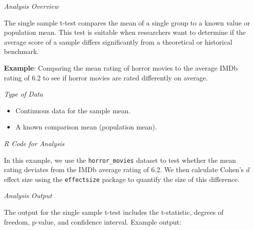 \documentclass[
]{book}
\newenvironment{Shaded}{\begin{snugshade}}{\end{snugshade}}
\newcommand{\AttributeTok}[1]{\textcolor[rgb]{0.13,0.29,0.53}{#1}}
\newcommand{\CommentTok}[1]{\textcolor[rgb]{0.56,0.35,0.01}{\textit{#1}}}
\newcommand{\FloatTok}[1]{\textcolor[rgb]{0.00,0.00,0.81}{#1}}
\newcommand{\FunctionTok}[1]{\textcolor[rgb]{0.13,0.29,0.53}{\textbf{#1}}}
\newcommand{\NormalTok}[1]{#1}
\newcommand{\OtherTok}[1]{\textcolor[rgb]{0.56,0.35,0.01}{#1}}
\newcommand{\SpecialCharTok}[1]{\textcolor[rgb]{0.81,0.36,0.00}{\textbf{#1}}}
\providecommand{\tightlist}{%
  \setlength{\itemsep}{0pt}\setlength{\parskip}{0pt}}
\begin{document}
\emph{Analysis Overview}

The single sample t-test compares the mean of a single group to a known value or population mean. This test is suitable when researchers want to determine if the average score of a sample differs significantly from a theoretical or historical benchmark.

\textbf{Example}: Comparing the mean rating of horror movies to the average IMDb rating of 6.2 to see if horror movies are rated differently on average.

\emph{Type of Data}

\begin{itemize}
\tightlist
\item
  Continuous data for the sample mean.
\item
  A known comparison mean (population mean).
\end{itemize}

\emph{R Code for Analysis}

In this example, we use the \texttt{horror\_movies} dataset to test whether the mean rating deviates from the IMDb average rating of 6.2. We then calculate Cohen's \(d\) effect size using the \texttt{effectsize} package to quantify the size of this difference.

\begin{Shaded}
\end{Shaded}

\emph{Analysis Output}

The output for the single sample t-test includes the t-statistic, degrees of freedom, p-value, and confidence interval. Example output:
\end{document}
